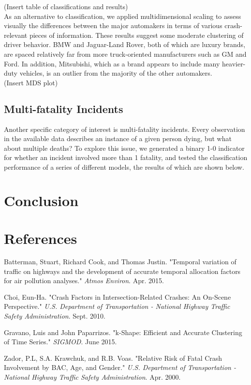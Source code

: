 \documentclass[11pt, oneside]{article}   	%
\begin{document}
(Insert table of classifications and results) \\

As an alternative to classification, we applied multidimensional scaling to assess visually the differences between the major automakers in terms of various crash-relevant pieces of information. These results suggest some moderate clustering of driver behavior. BMW and Jaguar-Land Rover, both of which are luxury brands, are spaced relatively far from more truck-oriented manufacturers such as GM and Ford. In addition, Mitsubishi, which as a brand appears to include many heavier-duty vehicles, is an outlier from the majority of the other automakers.\\

(Insert MDS plot) \\



\subsection*{Multi-fatality Incidents}
Another specific category of interest is multi-fatality incidents. Every observation in the available data describes an instance of a given person dying, but what about multiple deaths? To explore this issue, we generated a binary 1-0 indicator for whether an incident involved more than 1 fatality, and tested the classification performance of a series of different models, the results of which are shown below.



\section*{Conclusion}

\section*{References}
\begin{hangparas}{1.27cm}{1}
Batterman, Stuart, Richard Cook, and Thomas Justin. "Temporal variation of traffic on highways and the development of accurate temporal allocation factors for air pollution analyses." \textit{Atmos Environ}. Apr. 2015.

Choi, Eun-Ha. "Crash Factors in Intersection-Related Crashes: An On-Scene Perspective." \textit{U.S. Department of Transportation - National Highway Traffic Safety Administration}. Sept. 2010.

Gravano, Luis and John Paparrizos. "k-Shape: Efficient and Accurate Clustering of Time Series." \textit{SIGMOD}. June 2015.

Zador, P.L, S.A. Krawchuk, and R.B. Voas. "Relative Risk of Fatal Crash Involvement by BAC, Age, and Gender." \textit{U.S. Department of Transportation - National Highway Traffic Safety Administration}. Apr. 2000.




\end{hangparas}
\end{document}
